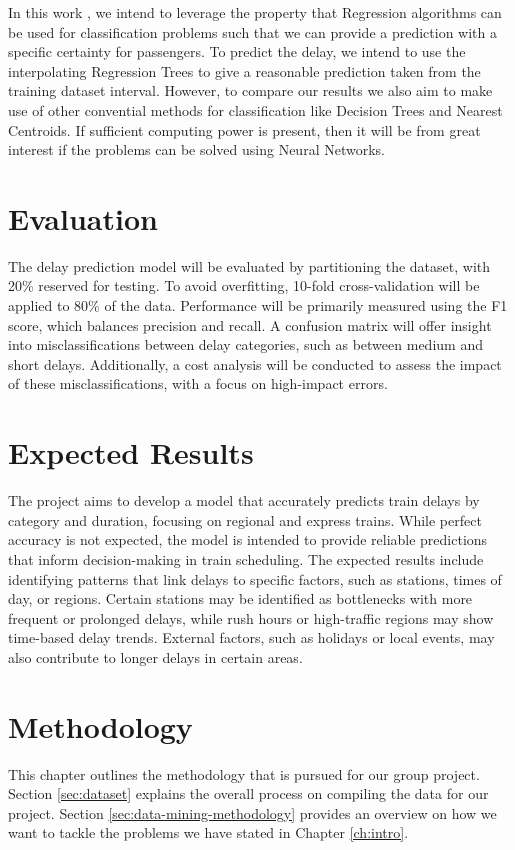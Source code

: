 \documentclass[a4paper,oneside,bibliography=totoc]{scrbook}
\begin{document}
    In this work , we intend to leverage the property that Regression algorithms can be used for classification problems such that we can provide a prediction with a specific certainty for passengers. To predict the delay, we intend to
    use the interpolating Regression Trees to give a reasonable prediction taken from the training dataset interval. However, to compare our results we also aim to make use of other convential methods for classification like Decision Trees and Nearest Centroids.
    If sufficient computing power is present, then it will be from great interest if the problems can be solved using Neural Networks.


    \chapter{Evaluation}\label{ch:eval}
    The delay prediction model will be evaluated by partitioning the dataset, with 20\% reserved for testing.
    To avoid overfitting, 10-fold cross-validation will be applied to 80\% of the data.
    Performance will be primarily measured using the F1 score, which balances precision and recall.
    A confusion matrix will offer insight into misclassifications between delay categories,
    such as between medium and short delays.
    Additionally, a cost analysis will be conducted to assess the impact of these misclassifications,
    with a focus on high-impact errors.

    \chapter{Expected Results}\label{sec:expected_results}

    The project aims to develop a model that accurately predicts train delays by category and duration, focusing on regional and express trains.
    While perfect accuracy is not expected, the model is intended to provide reliable predictions that inform decision-making in train scheduling.
    The expected results include identifying patterns that link delays to specific factors, such as stations, times of day, or regions.
    Certain stations may be identified as bottlenecks with more frequent or prolonged delays, while rush hours or high-traffic regions may show time-based delay trends.
    External factors, such as holidays or local events, may also contribute to longer delays in certain areas.


\chapter{Methodology}
\label{ch:methodology}
This chapter outlines the methodology that is pursued for our group project. Section \ref{sec:dataset} explains the overall process on compiling the data for our project. Section \ref{sec:data-mining-methodology} provides an overview on how we want to tackle the problems we have stated in Chapter \ref{ch:intro}.
\end{document}
